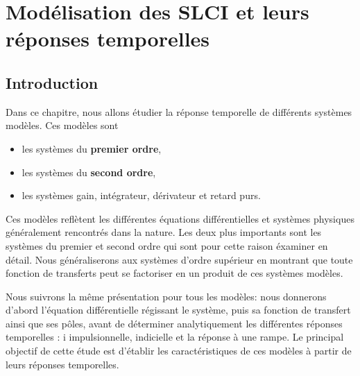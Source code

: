 \chapter[Modélisation des SLCI]{Modélisation des SLCI\label{chap-model} et leurs réponses temporelles}
\minitoc
\newpage
\section{Introduction}

Dans ce chapitre, nous allons étudier la réponse 
temporelle de différents systèmes modèles. Ces modèles sont 
\begin{itemize}
    \item les systèmes du \textbf{premier ordre},
    \item les systèmes du \textbf{second ordre},
    \item les systèmes gain, intégrateur, dérivateur et retard purs.
\end{itemize}
Ces modèles reflètent les différentes équations différentielles et 
systèmes physiques généralement rencontrés dans la nature.
Les deux plus importants sont les systèmes du premier et second ordre 
qui sont pour cette raison éxaminer en détail. 
Nous généraliserons aux systèmes d'ordre supérieur en montrant 
que toute fonction de transferts peut se factoriser en un produit
de ces systèmes modèles.

Nous suivrons la même présentation pour tous les modèles: 
nous donnerons d'abord l'équation différentielle régissant le système, puis 
sa fonction de transfert ainsi que ses pôles, avant de 
déterminer analytiquement les différentes réponses temporelles : i
impulsionnelle, indicielle et la réponse à une rampe. 
Le principal objectif de cette étude est d'établir les caractéristiques 
de ces modèles à partir de leurs réponses temporelles.

\newpage

